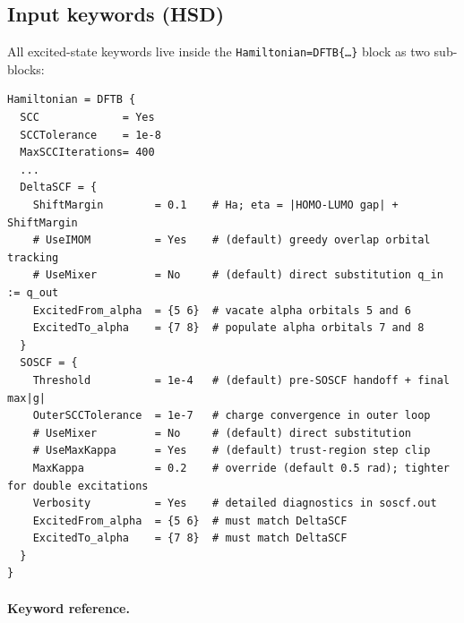 \documentclass[11pt,a4paper]{article}
\begin{document}
\subsection{Input keywords (HSD)}

All excited-state keywords live inside the
\texttt{Hamiltonian=DFTB\{\dots\}} block as two sub-blocks:

\begin{lstlisting}[style=hsd,caption={Input example: formaldehyde HOMO-1 $\to$ LUMO+1 / HOMO $\to$ LUMO+2 double excitation (illustrates overrides; keywords not shown take the defaults listed below).}]
Hamiltonian = DFTB {
  SCC             = Yes
  SCCTolerance    = 1e-8
  MaxSCCIterations= 400
  ...
  DeltaSCF = {
    ShiftMargin        = 0.1    # Ha; eta = |HOMO-LUMO gap| + ShiftMargin
    # UseIMOM          = Yes    # (default) greedy overlap orbital tracking
    # UseMixer         = No     # (default) direct substitution q_in := q_out
    ExcitedFrom_alpha  = {5 6}  # vacate alpha orbitals 5 and 6
    ExcitedTo_alpha    = {7 8}  # populate alpha orbitals 7 and 8
  }
  SOSCF = {
    Threshold          = 1e-4   # (default) pre-SOSCF handoff + final max|g|
    OuterSCCTolerance  = 1e-7   # charge convergence in outer loop
    # UseMixer         = No     # (default) direct substitution
    # UseMaxKappa      = Yes    # (default) trust-region step clip
    MaxKappa           = 0.2    # override (default 0.5 rad); tighter for double excitations
    Verbosity          = Yes    # detailed diagnostics in soscf.out
    ExcitedFrom_alpha  = {5 6}  # must match DeltaSCF
    ExcitedTo_alpha    = {7 8}  # must match DeltaSCF
  }
}
\end{lstlisting}

\paragraph{Keyword reference.}
\end{document}
